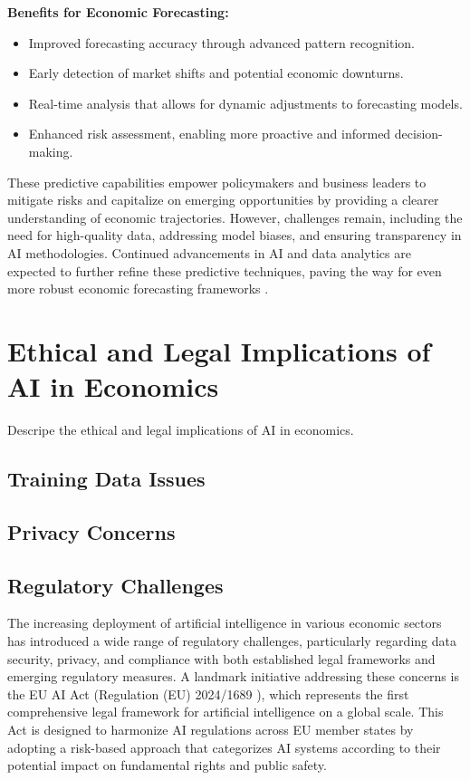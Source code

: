 \textbf{Benefits for Economic Forecasting:}
\begin{itemize}
    \item Improved forecasting accuracy through advanced pattern recognition.
    \item Early detection of market shifts and potential economic downturns.
    \item Real-time analysis that allows for dynamic adjustments to forecasting models.
    \item Enhanced risk assessment, enabling more proactive and informed decision-making.
\end{itemize}

These predictive capabilities empower policymakers and business leaders to mitigate risks and capitalize on emerging opportunities by providing a clearer understanding of economic trajectories. However, challenges remain, including the need for high-quality data, addressing model biases, and ensuring transparency in AI methodologies. Continued advancements in AI and data analytics are expected to further refine these predictive techniques, paving the way for even more robust economic forecasting frameworks \cite{Predictive-Analysis-ai}.

\section{Ethical and Legal Implications of AI in Economics}
\label{sec:ethical-and-legal-implications-of-ai-in-economics}

Descripe the ethical and legal implications of AI in economics. 


\subsection{Training Data Issues}

\subsection{Privacy Concerns}

\subsection{Regulatory Challenges}

The increasing deployment of artificial intelligence in various economic sectors has introduced a wide range of regulatory challenges, particularly regarding data security, privacy, and compliance with both established legal frameworks and emerging regulatory measures. A landmark initiative addressing these concerns is the EU AI Act (Regulation (EU) 2024/1689 \cite{EU-AI-Act-text}), which represents the first comprehensive legal framework for artificial intelligence on a global scale. This Act is designed to harmonize AI regulations across EU member states by adopting a risk-based approach that categorizes AI systems according to their potential impact on fundamental rights and public safety.

